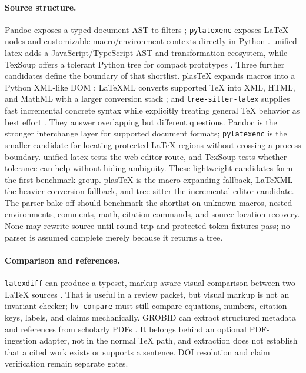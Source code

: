 \paragraph{Source structure.} Pandoc exposes a typed document AST to filters
\citep{pandoc2026filters}; \texttt{pylatexenc} exposes LaTeX nodes and
customizable macro/environment contexts directly in Python
\citep{pylatexenc2026}. unified-latex adds a JavaScript/TypeScript AST and
transformation ecosystem, while TexSoup offers a tolerant Python tree for
compact prototypes \citep{unifiedlatex2026,texsoup2026}. Three further
candidates define the boundary of that shortlist. plasTeX expands macros into a Python XML-like DOM
\citep{plastex2026}; LaTeXML converts supported TeX into XML, HTML, and MathML
with a larger conversion stack \citep{latexml2026}; and
\texttt{tree-sitter-latex} supplies fast incremental concrete syntax while
explicitly treating general TeX behavior as best effort
\citep{treesitterlatex2026}. They answer overlapping but different questions.
Pandoc is the stronger interchange layer for supported document formats;
\texttt{pylatexenc} is the smaller candidate for locating protected LaTeX
regions without crossing a process boundary. unified-latex tests the web-editor
route, and TexSoup tests whether tolerance can help without hiding ambiguity.
These lightweight candidates form the first benchmark group. plasTeX is the macro-expanding
fallback, LaTeXML the heavier conversion fallback, and tree-sitter the
incremental-editor candidate. The parser bake-off should benchmark the shortlist on
unknown macros, nested environments, comments, math, citation commands, and
source-location recovery. None may rewrite source until round-trip and
protected-token fixtures pass; no parser is assumed complete merely because it
returns a tree.

\paragraph{Comparison and references.} \texttt{latexdiff} can produce a
typeset, markup-aware visual comparison between two LaTeX sources
\citep{latexdiff2026}. That is useful in a review packet, but visual markup is
not an invariant checker; \texttt{hv compare} must still compare equations,
numbers, citation keys, labels, and claims mechanically. GROBID can extract
structured metadata and references from scholarly PDFs \citep{grobid2026}.
It belongs behind an optional PDF-ingestion adapter, not in the normal TeX
path, and extraction does not establish that a cited work exists or supports
a sentence. DOI resolution and claim verification remain separate gates.

